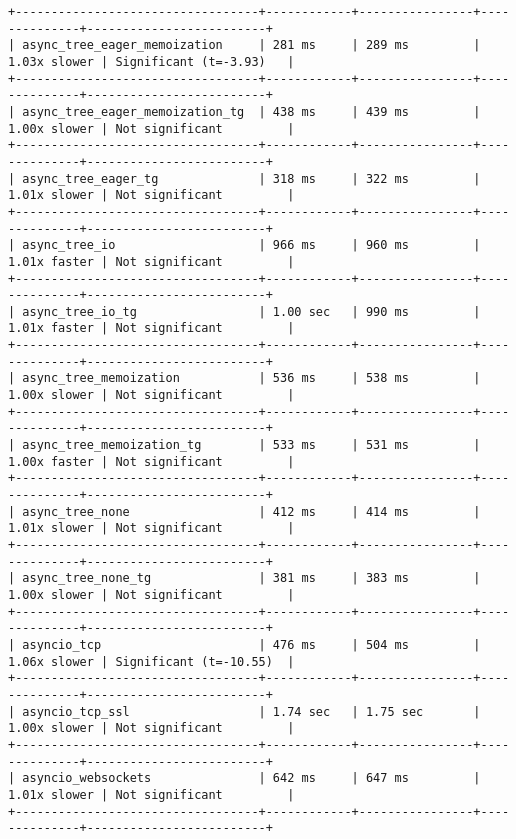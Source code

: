 \begin{code}
\begin{verbatim}
+----------------------------------+------------+----------------+--------------+-------------------------+
| async_tree_eager_memoization     | 281 ms     | 289 ms         | 1.03x slower | Significant (t=-3.93)   |
+----------------------------------+------------+----------------+--------------+-------------------------+
| async_tree_eager_memoization_tg  | 438 ms     | 439 ms         | 1.00x slower | Not significant         |
+----------------------------------+------------+----------------+--------------+-------------------------+
| async_tree_eager_tg              | 318 ms     | 322 ms         | 1.01x slower | Not significant         |
+----------------------------------+------------+----------------+--------------+-------------------------+
| async_tree_io                    | 966 ms     | 960 ms         | 1.01x faster | Not significant         |
+----------------------------------+------------+----------------+--------------+-------------------------+
| async_tree_io_tg                 | 1.00 sec   | 990 ms         | 1.01x faster | Not significant         |
+----------------------------------+------------+----------------+--------------+-------------------------+
| async_tree_memoization           | 536 ms     | 538 ms         | 1.00x slower | Not significant         |
+----------------------------------+------------+----------------+--------------+-------------------------+
| async_tree_memoization_tg        | 533 ms     | 531 ms         | 1.00x faster | Not significant         |
+----------------------------------+------------+----------------+--------------+-------------------------+
| async_tree_none                  | 412 ms     | 414 ms         | 1.01x slower | Not significant         |
+----------------------------------+------------+----------------+--------------+-------------------------+
| async_tree_none_tg               | 381 ms     | 383 ms         | 1.00x slower | Not significant         |
+----------------------------------+------------+----------------+--------------+-------------------------+
| asyncio_tcp                      | 476 ms     | 504 ms         | 1.06x slower | Significant (t=-10.55)  |
+----------------------------------+------------+----------------+--------------+-------------------------+
| asyncio_tcp_ssl                  | 1.74 sec   | 1.75 sec       | 1.00x slower | Not significant         |
+----------------------------------+------------+----------------+--------------+-------------------------+
| asyncio_websockets               | 642 ms     | 647 ms         | 1.01x slower | Not significant         |
+----------------------------------+------------+----------------+--------------+-------------------------+

\end{verbatim}
\end{code}
